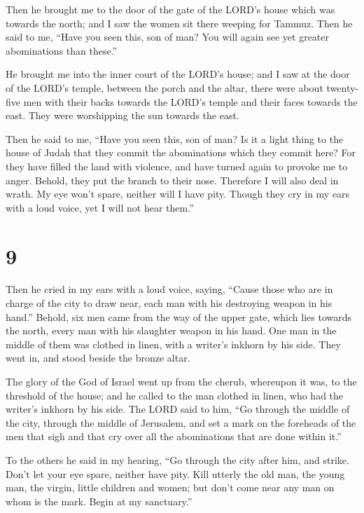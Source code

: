  Then he brought me to the door of the gate of the LORD's
house which was towards the north; and I saw the women sit there weeping
for Tammuz.  Then he said to me, ``Have you seen this,
son of man? You will again see yet greater abominations than these.''

 He brought me into the inner court of the LORD's house;
and I saw at the door of the LORD's temple, between the porch and the
altar, there were about twenty-five men with their backs towards the
LORD's temple and their faces towards the east. They were worshipping
the sun towards the east.

 Then he said to me, ``Have you seen this, son of man? Is
it a light thing to the house of Judah that they commit the abominations
which they commit here? For they have filled the land with violence, and
have turned again to provoke me to anger. Behold, they put the branch to
their nose.  Therefore I will also deal in wrath. My eye
won't spare, neither will I have pity. Though they cry in my ears with a
loud voice, yet I will not hear them.''

\hypertarget{section-7}{%
\section{9}\label{section-7}}

 Then he cried in my ears with a loud voice, saying,
``Cause those who are in charge of the city to draw near, each man with
his destroying weapon in his hand.''  Behold, six men came
from the way of the upper gate, which lies towards the north, every man
with his slaughter weapon in his hand. One man in the middle of them was
clothed in linen, with a writer's inkhorn by his side. They went in, and
stood beside the bronze altar.

 The glory of the God of Israel went up from the cherub,
whereupon it was, to the threshold of the house; and he called to the
man clothed in linen, who had the writer's inkhorn by his side.
 The LORD said to him, ``Go through the middle of the
city, through the middle of Jerusalem, and set a mark on the foreheads
of the men that sigh and that cry over all the abominations that are
done within it.''

 To the others he said in my hearing, ``Go through the
city after him, and strike. Don't let your eye spare, neither have pity.
 Kill utterly the old man, the young man, the virgin,
little children and women; but don't come near any man on whom is the
mark. Begin at my sanctuary.''

